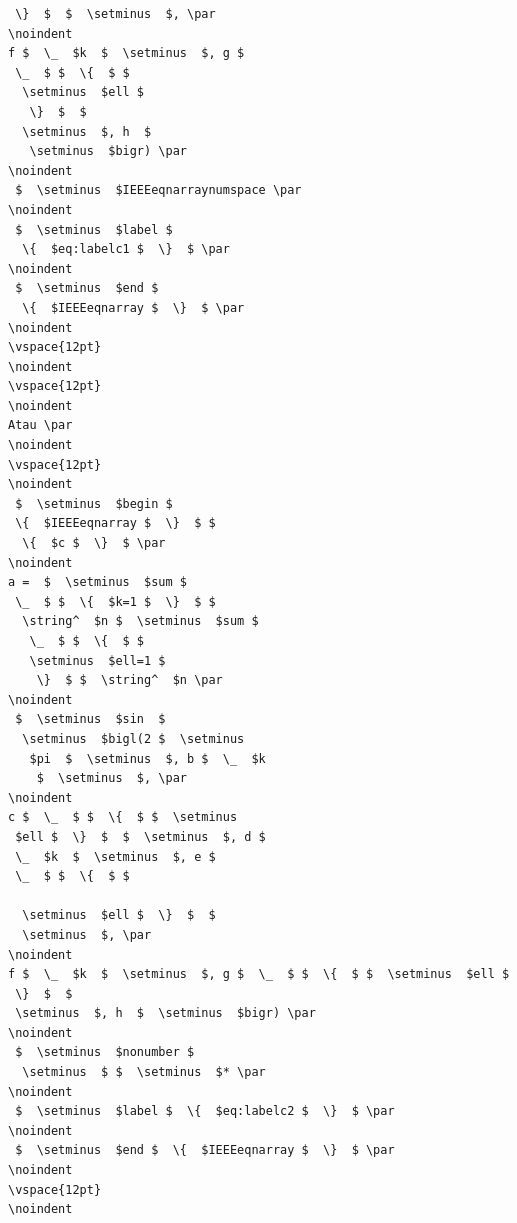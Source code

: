 \begin{verbatim}
 \}  $  $  \setminus  $, \par
\noindent 
f $  \_  $k  $  \setminus  $, g $ 
 \_  $ $  \{  $ $ 
  \setminus  $ell $ 
   \}  $  $
  \setminus  $, h  $ 
   \setminus  $bigr) \par
\noindent 
 $  \setminus  $IEEEeqnarraynumspace \par
\noindent 
 $  \setminus  $label $ 
  \{  $eq:labelc1 $  \}  $ \par
\noindent 
 $  \setminus  $end $ 
  \{  $IEEEeqnarray $  \}  $ \par
\noindent 
\vspace{12pt}
\noindent 
\vspace{12pt}
\noindent 
Atau \par
\noindent 
\vspace{12pt}
\noindent 
 $  \setminus  $begin $  
 \{  $IEEEeqnarray $  \}  $ $ 
  \{  $c $  \}  $ \par
\noindent 
a =  $  \setminus  $sum $ 
 \_  $ $  \{  $k=1 $  \}  $ $ 
  \string^  $n $  \setminus  $sum $ 
   \_  $ $  \{  $ $  
   \setminus  $ell=1 $ 
    \}  $ $  \string^  $n \par
\noindent 
 $  \setminus  $sin  $ 
  \setminus  $bigl(2 $  \setminus 
   $pi  $  \setminus  $, b $  \_  $k 
    $  \setminus  $, \par
\noindent 
c $  \_  $ $  \{  $ $  \setminus 
 $ell $  \}  $  $  \setminus  $, d $  
 \_  $k  $  \setminus  $, e $  
 \_  $ $  \{  $ $ 
 
  \setminus  $ell $  \}  $  $  
  \setminus  $, \par
\noindent 
f $  \_  $k  $  \setminus  $, g $  \_  $ $  \{  $ $  \setminus  $ell $ 
 \}  $  $ 
 \setminus  $, h  $  \setminus  $bigr) \par
\noindent 
 $  \setminus  $nonumber $ 
  \setminus  $ $  \setminus  $* \par
\noindent 
 $  \setminus  $label $  \{  $eq:labelc2 $  \}  $ \par
\noindent 
 $  \setminus  $end $  \{  $IEEEeqnarray $  \}  $ \par
\noindent 
\vspace{12pt}
\noindent 
 \end{verbatim}

